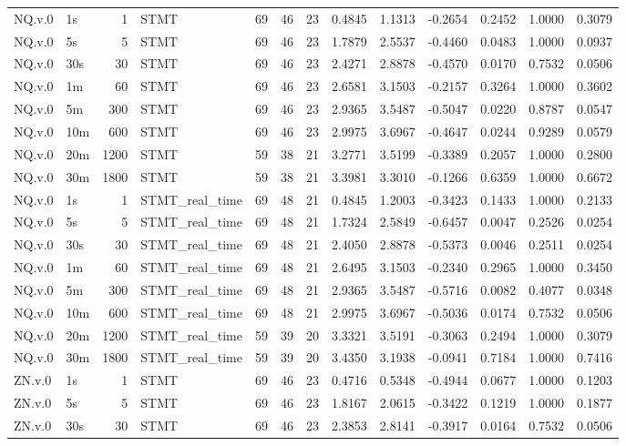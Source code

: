 \begin{tabular}{llrlrrrrrrrrr}
NQ.v.0 & 1s & 1 & STMT & 69 & 46 & 23 & 0.4845 & 1.1313 & -0.2654 & 0.2452 & 1.0000 & 0.3079 \\
NQ.v.0 & 5s & 5 & STMT & 69 & 46 & 23 & 1.7879 & 2.5537 & -0.4460 & 0.0483 & 1.0000 & 0.0937 \\
NQ.v.0 & 30s & 30 & STMT & 69 & 46 & 23 & 2.4271 & 2.8878 & -0.4570 & 0.0170 & 0.7532 & 0.0506 \\
NQ.v.0 & 1m & 60 & STMT & 69 & 46 & 23 & 2.6581 & 3.1503 & -0.2157 & 0.3264 & 1.0000 & 0.3602 \\
NQ.v.0 & 5m & 300 & STMT & 69 & 46 & 23 & 2.9365 & 3.5487 & -0.5047 & 0.0220 & 0.8787 & 0.0547 \\
NQ.v.0 & 10m & 600 & STMT & 69 & 46 & 23 & 2.9975 & 3.6967 & -0.4647 & 0.0244 & 0.9289 & 0.0579 \\
NQ.v.0 & 20m & 1200 & STMT & 59 & 38 & 21 & 3.2771 & 3.5199 & -0.3389 & 0.2057 & 1.0000 & 0.2800 \\
NQ.v.0 & 30m & 1800 & STMT & 59 & 38 & 21 & 3.3981 & 3.3010 & -0.1266 & 0.6359 & 1.0000 & 0.6672 \\
NQ.v.0 & 1s & 1 & STMT_real_time & 69 & 48 & 21 & 0.4845 & 1.2003 & -0.3423 & 0.1433 & 1.0000 & 0.2133 \\
NQ.v.0 & 5s & 5 & STMT_real_time & 69 & 48 & 21 & 1.7324 & 2.5849 & -0.6457 & 0.0047 & 0.2526 & 0.0254 \\
NQ.v.0 & 30s & 30 & STMT_real_time & 69 & 48 & 21 & 2.4050 & 2.8878 & -0.5373 & 0.0046 & 0.2511 & 0.0254 \\
NQ.v.0 & 1m & 60 & STMT_real_time & 69 & 48 & 21 & 2.6495 & 3.1503 & -0.2340 & 0.2965 & 1.0000 & 0.3450 \\
NQ.v.0 & 5m & 300 & STMT_real_time & 69 & 48 & 21 & 2.9365 & 3.5487 & -0.5716 & 0.0082 & 0.4077 & 0.0348 \\
NQ.v.0 & 10m & 600 & STMT_real_time & 69 & 48 & 21 & 2.9975 & 3.6967 & -0.5036 & 0.0174 & 0.7532 & 0.0506 \\
NQ.v.0 & 20m & 1200 & STMT_real_time & 59 & 39 & 20 & 3.3321 & 3.5191 & -0.3063 & 0.2494 & 1.0000 & 0.3079 \\
NQ.v.0 & 30m & 1800 & STMT_real_time & 59 & 39 & 20 & 3.4350 & 3.1938 & -0.0941 & 0.7184 & 1.0000 & 0.7416 \\
ZN.v.0 & 1s & 1 & STMT & 69 & 46 & 23 & 0.4716 & 0.5348 & -0.4944 & 0.0677 & 1.0000 & 0.1203 \\
ZN.v.0 & 5s & 5 & STMT & 69 & 46 & 23 & 1.8167 & 2.0615 & -0.3422 & 0.1219 & 1.0000 & 0.1877 \\
ZN.v.0 & 30s & 30 & STMT & 69 & 46 & 23 & 2.3853 & 2.8141 & -0.3917 & 0.0164 & 0.7532 & 0.0506 \\

\end{tabular}
